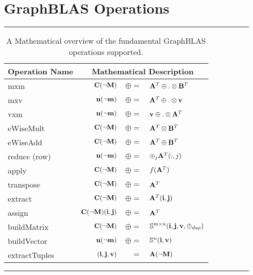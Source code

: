 \section{GraphBLAS Operations}
\label{Sec:Operations}

\begin{table*}[h]
\hrule
\begin{center}
\caption{A Mathematical overview of the fundamental GraphBLAS operations supported.}
\label{Tab:GraphBLASOps}
\begin{tabular}{l|rrl}
{\sf Operation Name} & \multicolumn{3}{c}{Mathematical Description}  \\
\hline
{\sf mxm}          & ${\bf C}(\neg{\bf M})$ & $\oplus=$ & ${\bf A}^T \oplus.\otimes {\bf B}^T$  \\
{\sf mxv}          & ${\bf u}(\neg{\bf m})$ & $\oplus=$ & ${\bf A}^T \oplus.\otimes {\bf v}$  \\
{\sf vxm}          & ${\bf u}(\neg{\bf m})$ & $\oplus=$ & ${\bf v} \oplus.\otimes {\bf A}^T$  \\
{\sf eWiseMult}    & ${\bf C}(\neg{\bf M})$ & $\oplus=$ & ${\bf A}^T \otimes {\bf B}^T$  \\
{\sf eWiseAdd}     & ${\bf C}(\neg{\bf M})$ & $\oplus=$ & ${\bf A}^T \oplus  {\bf B}^T$  \\
{\sf reduce} (row) & ${\bf u}(\neg{\bf m})$ & $\oplus=$ & $\oplus_j{\bf A}^T(:,j)$  \\
{\sf apply}        & ${\bf C}(\neg{\bf M})$ & $\oplus=$ & $f({\bf A}^T)$ \\
{\sf transpose}    & ${\bf C}(\neg{\bf M})$ & $\oplus=$ & ${\bf A}^T$ \\
{\sf extract}      & ${\bf C}(\neg{\bf M})$ & $\oplus=$ & ${\bf A}^T({\bf i},{\bf j})$ \\
{\sf assign}       & ${\bf C}(\neg{\bf M})({\bf i},{\bf j})$ & $\oplus=$ & ${\bf A}^T$ \\
{\sf buildMatrix}  & ${\bf C}(\neg{\bf M})$ & $\oplus=$ & $\mathbb{S}^{m\times n}({\bf i},{\bf j},{\bf v},\oplus_{dup})$ \\
{\sf buildVector}  & ${\bf u}(\neg{\bf m})$ & $\oplus=$ & $\mathbb{S}^{n}({\bf i},{\bf v})$ \\
{\sf extractTuples}& $({\bf i},{\bf j},{\bf v})$ & $=$ & ${\bf A}(\neg{\bf M})$ \\
\end{tabular}
\end{center}
\hrule
\end{table*}

